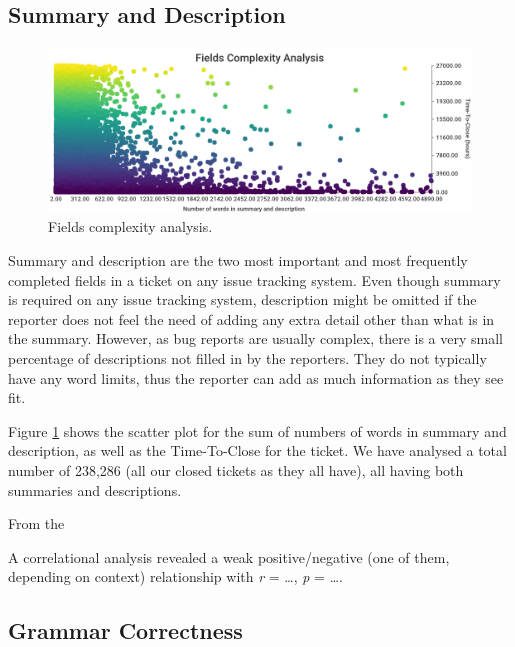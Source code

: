 \documentclass{mpaper}
\begin{document}
\subsection{Summary and Description}

\begin{figure}[ht]
  \begin{center}
    \includegraphics[scale=0.23]{images/fields_complexity.png}
  \end{center}
  \caption{\label{fields}Fields complexity analysis.}
\end{figure}

Summary and description are the two most important and most frequently completed fields in a ticket on any
issue tracking system. Even though summary is required on any issue tracking system, description might 
be omitted if the reporter does not feel the need of adding any extra detail other than what is in the summary. 
However, as bug reports are usually complex, there is a very small percentage of descriptions not filled in 
by the reporters. They do not typically have any word limits, thus the reporter can add as much information as 
they see fit.

Figure \ref{fields} shows the scatter plot for the sum of numbers of words in summary and description, as well 
as the Time-To-Close for the ticket. We have analysed a total number of 238,286 (all our closed tickets as they 
all have), all having both summaries and descriptions.

From the 

A correlational analysis revealed a weak positive/negative (one of them, depending on context) relationship
with \emph{r} = \dots, \emph{p} = \dots.

\subsection{Grammar Correctness}
\end{document}
